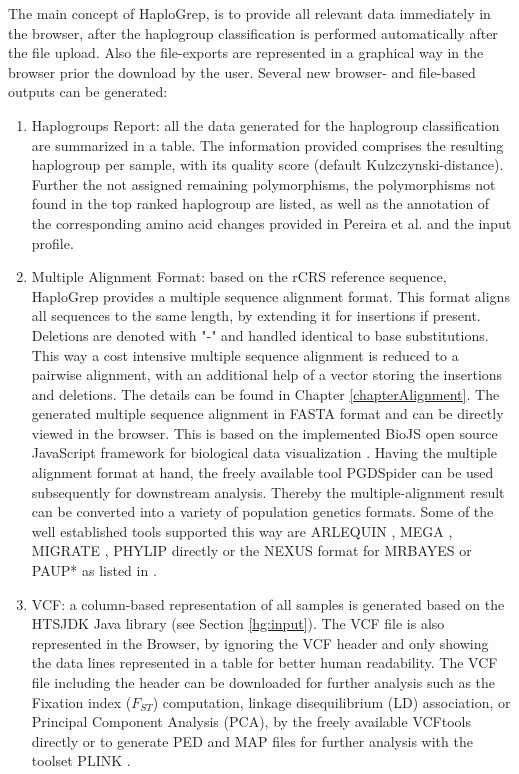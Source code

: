 The main concept of HaploGrep, is to provide all relevant data immediately in the browser, after the haplogroup classification is performed automatically after the file upload. Also the file-exports are represented in a graphical way in the browser prior the download by the user. Several new browser- and file-based outputs can be generated:
\begin{enumerate}
\item Haplogroups Report: all the data generated for the haplogroup classification are summarized in a table. The information provided comprises the resulting haplogroup per sample, with its quality score (default Kulzczynski-distance). Further the not assigned remaining polymorphisms, the polymorphisms not found in the top ranked haplogroup are listed, as well as the annotation of the corresponding amino acid changes provided in Pereira et al. \cite{Pereira2011} and the input profile.
\item Multiple Alignment Format: based on the rCRS reference sequence, HaploGrep provides a multiple sequence alignment format. This format aligns all sequences to the same length, by extending it for insertions if present. Deletions are denoted with "-" and handled identical to base substitutions. This way a cost intensive multiple sequence alignment is reduced to a pairwise alignment, with an additional help of a vector storing the insertions and deletions. The details can be found in Chapter \ref{chapterAlignment}. The  generated multiple sequence alignment in FASTA format and can be directly viewed in the browser. This is based on the implemented BioJS open source JavaScript framework for biological data visualization \cite{Gomez2013}. Having the multiple alignment format at hand, the freely available tool PGDSpider \cite{Lischer2012} can be used subsequently for downstream analysis. Thereby the multiple-alignment result can be converted into a variety of population genetics formats. Some of the well established tools supported this way are ARLEQUIN \cite{Excoffier2010}, MEGA \cite{Tamura2013}, MIGRATE \cite{Beerli2010}, PHYLIP \cite{Felsenstein1989} directly or the NEXUS format \cite{Maddison1997} for MRBAYES \cite{Huelsenbeck2001} or PAUP* \cite{Swofford2003} as listed in \cite{Weissensteiner2016a}.
\item VCF: a column-based representation of all samples is generated based on the HTSJDK Java library (see Section \ref{hg:input}). The VCF file is also represented in the Browser, by ignoring the VCF header and only showing the data lines represented in a table for better human readability. The VCF file including the header can be downloaded for further analysis such as the Fixation index ($F_{ST}$) computation, linkage disequilibrium (LD) association, or Principal Component Analysis (PCA), by the freely available VCFtools \cite{Danecek2011} directly or to generate PED and MAP files for further analysis with the toolset PLINK \cite{Purcell2007}.

\end{enumerate}
